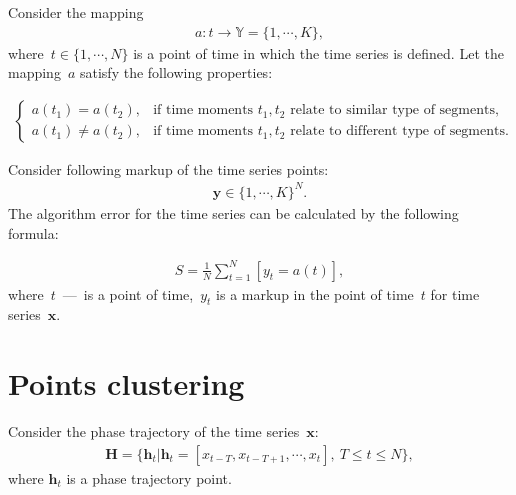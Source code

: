 \documentclass[12pt, twoside]{article}
\numberwithin{equation}{section}
\begin{document}
Consider the mapping
\begin{equation}
\label{eq:st:4}
\begin{aligned}
a : t \to \mathbb{Y} = \{1,\cdots, K\}, 
\end{aligned}
\end{equation}
where~$t \in \{1,\cdots, N\}$ is a point of time in which the time series is defined.
Let the mapping~$a$ satisfy the following properties:

\begin{equation}
\label{eq:st:5}
\begin{aligned}
\begin{cases}
    a\left(t_1\right) = a\left(t_2\right), &  \text{if time moments } t_1, t_2 \text{ relate to similar type of segments,}\\
    a\left(t_1\right) \not= a\left(t_2\right), &  \text{if time moments } t_1, t_2 \text{ relate to different type of segments.}
\end{cases}
\end{aligned}
\end{equation}

Consider following markup of the time series points:
\begin{equation}
\label{eq:st:6}
\begin{aligned}
\textbf{y} \in \{1,\cdots,K\}^{N}.
\end{aligned}
\end{equation}
The algorithm error for the time series can be calculated by the following formula:

\begin{equation}
\label{eq:st:7}
\begin{aligned}
S = \frac{1}{N}\sum_{t=1}^{N}[y_t = a\left(t\right)],
\end{aligned}
\end{equation}
where~$t$~---~is a point of time,~$y_t$ is a markup in the point of time~$t$ for time series~$\textbf{x}$.


\section{Points clustering}
Consider the phase trajectory of the time series~$\textbf{x}$:
\begin{equation}
\label{eq:cl:1}
\begin{aligned}
\mathbf{H} = \{\textbf{h}_t| \textbf{h}_t = [x_{t-T}, x_{t-T+1}, \cdots, x_{t}],~T\leq t\leq N\},
\end{aligned}
\end{equation}
where $\textbf{h}_t$ is a phase trajectory point.
\end{document}
